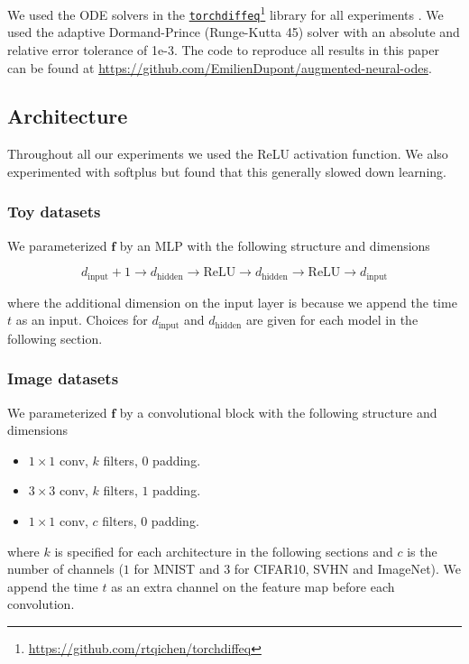 \documentclass{article}
\begin{document}
We used the ODE solvers in the \href{https://github.com/rtqichen/torchdiffeq}{\texttt{torchdiffeq}}\footnote{\href{https://github.com/rtqichen/torchdiffeq}{https://github.com/rtqichen/torchdiffeq}} library for all experiments \citep{chen2018neural}. We used the adaptive Dormand-Prince (Runge-Kutta 45) solver with an absolute and relative error tolerance of 1e-3. The code to reproduce all results in this paper can be found at \url{https://github.com/EmilienDupont/augmented-neural-odes}.

\subsection{Architecture}

Throughout all our experiments we used the ReLU activation function. We also experimented with softplus but found that this generally slowed down learning.

\subsubsection{Toy datasets}

We parameterized $\mathbf{f}$ by an MLP with the following structure and dimensions

$$ d_\text{input}+1 \to d_\text{hidden} \to \text{ReLU} \to  d_\text{hidden} \to \text{ReLU} \to d_\text{input}$$

where the additional dimension on the input layer is because we append the time $t$ as an input. Choices for $d_\text{input}$ and $d_\text{hidden}$ are given for each model in the following section.

\subsubsection{Image datasets}

We parameterized $\mathbf{f}$ by a convolutional block with the following structure and dimensions

\begin{itemize}
    \item $1 \times 1$ conv, $k$ filters, $0$ padding.
    \item $3 \times 3$ conv, $k$ filters, $1$ padding.
    \item $1 \times 1$ conv, $c$ filters, $0$ padding.
\end{itemize}

where $k$ is specified for each architecture in the following sections and $c$ is the number of channels ($1$ for MNIST and $3$ for CIFAR10, SVHN and ImageNet). We append the time $t$ as an extra channel on the feature map before each convolution.
\end{document}
